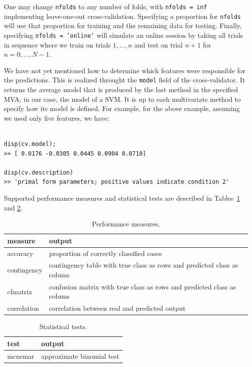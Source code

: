 \documentclass{article}
\renewcommand{\t}[1]{{\tt #1}}
\begin{document}
One may change \t{nfolds} to any number of folds, with \t{nfolds = inf} implementing leave-one-out cross-validation. Specifying a proportion for \t{nfolds} will use that proportion for training and the remaining data for testing. Finally, specifying \t{nfolds = 'online'} will simulate an online session by taking all trials in sequence where we train on trials $1,\ldots,n$ and test on trial $n+1$ for $n=0,\ldots,N-1$.

We have not yet mentioned how to determine which features were responsible for the predictions. This is realized throught the \t{model} field of the cross-validator. It returns the average model that is produced by the last method in the specified MVA; in our case, the model of a SVM. It is up to each multivariate method to  specify how its model is defined. For example, for the above example, assuming we used only five features, we have:
\begin{verbatim}

disp(cv.model);
>> [ 0.0176 -0.0305 0.0445 0.0904 0.0710]

disp(cv.description)
>> 'primal form parameters; positive values indicate condition 2'

\end{verbatim}

Supported performance measures and statistical tests are described in Tables~\ref{tab:measure} and \ref{tab:test}.
\begin{table}[ht]
\centering
\caption{Performance measures.}
\begin{tabular}{p{}|p{}}
{\bf measure} & {\bf output}\\
\hline
accuracy &proportion of correctly classified cases\\
contingency & contingency table with true class as rows and predicted class as colums\\
cfmatrix & confusion matrix with true class as rows and predicted class as colums\\
correlation & correlation between real and predicted output
\end{tabular}
\label{tab:measure}
\end{table}

\begin{table}[ht]
\centering
\caption{Statistical tests.}
\begin{tabular}{p{}|p{}}
{\bf test} & {\bf output}\\
\hline
mcnemar & approximate binomial test
\end{tabular}
\label{tab:test}
\end{table}
\end{document}
